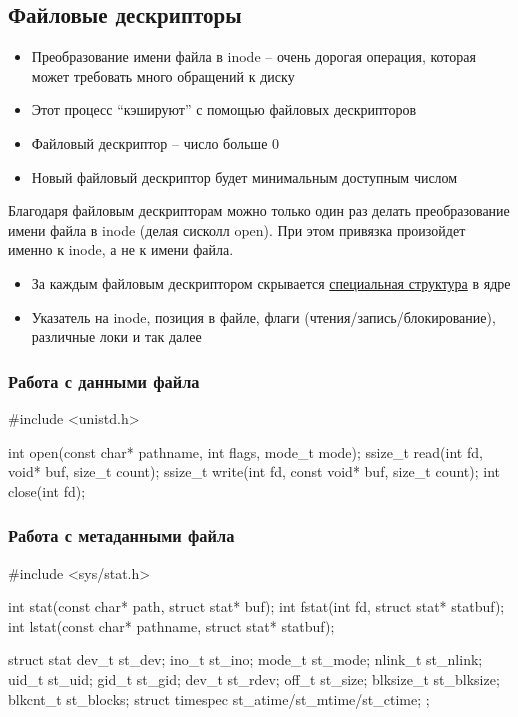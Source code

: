   \subsection{Файловые дескрипторы}
    \begin{itemize}
      \item Преобразование имени файла в inode -- очень дорогая операция, которая может требовать много обращений к диску
      \item Этот процесс ``кэшируют'' с помощью файловых дескрипторов
      \item Файловый дескриптор -- число больше 0
      \item Новый файловый дескриптор будет минимальным доступным числом
    \end{itemize}
  Благодаря файловым дескрипторам можно только один раз делать преобразование имени файла в inode (делая сисколл open). При этом привязка произойдет именно к inode, а не к имени файла.
    \begin{itemize}
      \item За каждым файловым дескриптором скрывается \href{https://elixir.bootlin.com/linux/v5.19.12/source/include/linux/fs.h#L925}{специальная структура} в ядре
      \item Указатель на inode, позиция в файле, флаги (чтения/запись/блокирование), различные локи и так далее
    \end{itemize}
  
    \subsubsection{Работа с данными файла}
\begin{cminted}
#include <unistd.h>

int open(const char* pathname, int flags, mode_t mode);
ssize_t read(int fd, void* buf, size_t count);
ssize_t write(int fd, const void* buf, size_t count);
int close(int fd);
\end{cminted}
    
    \subsubsection{Работа с метаданными файла}
\begin{cminted}
#include <sys/stat.h>

int stat(const char* path, struct stat* buf);
int fstat(int fd, struct stat* statbuf);
int lstat(const char* pathname, struct stat* statbuf);

struct stat {
  dev_t     st_dev;
  ino_t     st_ino;
  mode_t    st_mode;
  nlink_t   st_nlink;
  uid_t     st_uid;
  gid_t     st_gid;
  dev_t     st_rdev;
  off_t     st_size;
  blksize_t st_blksize;
  blkcnt_t  st_blocks;
  struct timespec st_atime/st_mtime/st_ctime;
};
\end{cminted}
    
